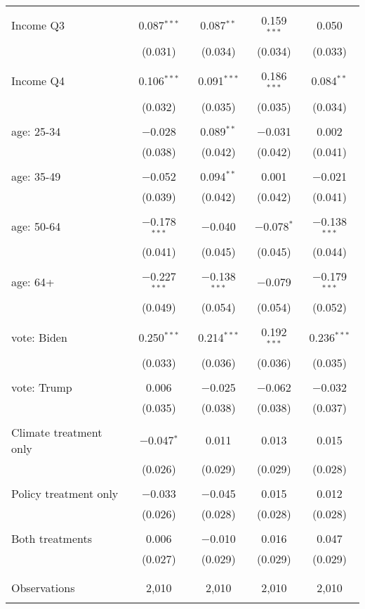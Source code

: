 \begin{tabular}{@{\extracolsep{5pt}}lcccc}
  & & & & \\ 
 Income Q3 & 0.087$^{***}$ & 0.087$^{**}$ & 0.159$^{***}$ & 0.050 \\ 
  & (0.031) & (0.034) & (0.034) & (0.033) \\ 
  & & & & \\ 
 Income Q4 & 0.106$^{***}$ & 0.091$^{***}$ & 0.186$^{***}$ & 0.084$^{**}$ \\ 
  & (0.032) & (0.035) & (0.035) & (0.034) \\ 
  & & & & \\ 
 age: 25-34 & $-$0.028 & 0.089$^{**}$ & $-$0.031 & 0.002 \\ 
  & (0.038) & (0.042) & (0.042) & (0.041) \\ 
  & & & & \\ 
 age: 35-49 & $-$0.052 & 0.094$^{**}$ & 0.001 & $-$0.021 \\ 
  & (0.039) & (0.042) & (0.042) & (0.041) \\ 
  & & & & \\ 
 age: 50-64 & $-$0.178$^{***}$ & $-$0.040 & $-$0.078$^{*}$ & $-$0.138$^{***}$ \\ 
  & (0.041) & (0.045) & (0.045) & (0.044) \\ 
  & & & & \\ 
 age: 64+ & $-$0.227$^{***}$ & $-$0.138$^{***}$ & $-$0.079 & $-$0.179$^{***}$ \\ 
  & (0.049) & (0.054) & (0.054) & (0.052) \\ 
  & & & & \\ 
 vote: Biden & 0.250$^{***}$ & 0.214$^{***}$ & 0.192$^{***}$ & 0.236$^{***}$ \\ 
  & (0.033) & (0.036) & (0.036) & (0.035) \\ 
  & & & & \\ 
 vote: Trump & 0.006 & $-$0.025 & $-$0.062 & $-$0.032 \\ 
  & (0.035) & (0.038) & (0.038) & (0.037) \\ 
  & & & & \\ 
 Climate treatment only & $-$0.047$^{*}$ & 0.011 & 0.013 & 0.015 \\ 
  & (0.026) & (0.029) & (0.029) & (0.028) \\ 
  & & & & \\ 
 Policy treatment only & $-$0.033 & $-$0.045 & 0.015 & 0.012 \\ 
  & (0.026) & (0.028) & (0.028) & (0.028) \\ 
  & & & & \\ 
 Both treatments & 0.006 & $-$0.010 & 0.016 & 0.047 \\ 
  & (0.027) & (0.029) & (0.029) & (0.029) \\ 
  & & & & \\ 
\hline \\[-1.8ex] 

Observations & 2,010 & 2,010 & 2,010 & 2,010 \\ 
\hline 
\hline \\[-1.8ex] 
\end{tabular} 